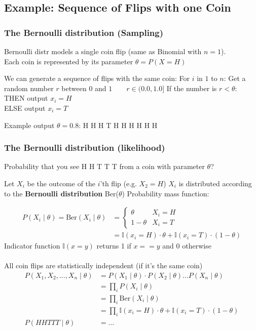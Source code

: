 \documentclass{article}
\begin{document}
	\subsection{Example: Sequence of Flips with one Coin}
	\subsubsection*{\quad The Bernoulli distribution (Sampling)}
	Bernoulli distr models a single coin flip (same as Binomial with $n=1$).\\
	Each coin is represented by its parameter $\theta = P(X = H)$
	\begin{outline}
		\1 We can generate a sequence of flips with the same coin:
		\2 For $i$ in $1$ to $n$:
		\3 Get a random number $r$ between $0$ and $1 \qquad r \in (0.0,1.0]$
		\3 If the number is $r < \theta:$\\
			THEN output $x_i = H$\\
			ELSE output $x_i = T$
	\end{outline}
	Example output $\theta = 0.8$: H H H T H H H H H H
	\subsubsection*{The Bernoulli distribution (likelihood)}
	Probability that you see H H T T T from a coin with parameter $\theta$?
	\begin{outline}
		\1 Let $X_i$ be the outcome of the $i$'th flip (e.g. $X_2 = H$)
		\1 $X_i$ is distributed according to the \textbf{Bernoulli distribution} Ber($\theta$)
		\1 Probability mass function:
	\end{outline}
	\begin{align*}
		P(X_i \;|\; \theta) = \text{Ber}(X_i \;|\; \theta) &= \begin{cases}
			\theta & X_i = H\\
			1 - \theta & X_i = T
		\end{cases}\\
		&= \mathbb{I}(x_i = H) \cdot \theta + \mathbb{I}(x_i = T) \cdot (1 - \theta)
	\end{align*}
	Indicator function $\mathbb{I}(x = y)$ returns 1 if $x==y$ and 0 otherwise\\
	\\
	All coin flips are statistically independent (if it's the same coin)
	\begin{align*}
		P(X_1,X_2,...,X_n \;|\; \theta) &= P(X_1 \;|\; \theta) \cdot P(X_2 \;|\; \theta) ... P(X_n \;|\; \theta)\\
		&= \prod_{i} P(X_i \;|\; \theta)\\
		&= \prod_{i} \text{Ber}(X_i \;|\; \theta)\\
		&= \prod_{i} \mathbb{I}(x_i = H) \cdot \theta + \mathbb{I}(x_i = T) \cdot (1 - \theta)\\
		P(HHTTT \;|\; \theta) &= ...
	\end{align*}
\end{document}
